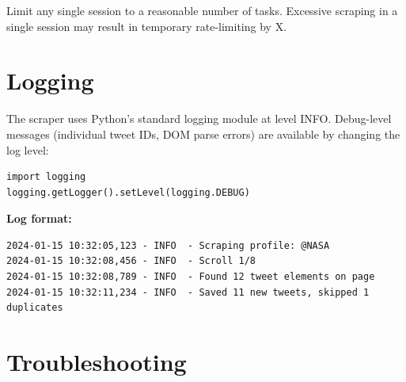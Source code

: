 \documentclass[11pt, a4paper]{article}
\newenvironment{tipbox}[1][Tip]{%
  \begin{tcolorbox}[enhanced, breakable,
    colback=TwGreen!8, colframe=TwGreen,
    boxrule=0.8pt, arc=5pt,
    left=8pt, right=8pt, top=5pt, bottom=5pt,
    title={\textbf{#1}},
    fonttitle=\small\color{TwGreen!70!black},
    attach boxed title to top left={yshift=-2mm, xshift=8mm},
    boxed title style={colback=TwGreen!8, colframe=TwGreen, arc=3pt}]
}{\end{tcolorbox}}
\def\texttt#1{#1}%
\def\color#1{}%
\begin{document}
\begin{tipbox}[Best Practice]
Limit any single session to a reasonable number of tasks. Excessive scraping
in a single session may result in temporary rate-limiting by X.
\end{tipbox}

\section{Logging}

The scraper uses Python's standard \texttt{logging} module at level \texttt{INFO}.
Debug-level messages (individual tweet IDs, DOM parse errors) are available
by changing the log level:

\begin{tcolorbox}[pybox, title=Enable debug logging]
\begin{lstlisting}[style=pycode]
import logging
logging.getLogger().setLevel(logging.DEBUG)
\end{lstlisting}
\end{tcolorbox}

\textbf{Log format:}
\begin{tcolorbox}[bashbox]
\begin{lstlisting}[style=bashcode]
2024-01-15 10:32:05,123 - INFO  - Scraping profile: @NASA
2024-01-15 10:32:08,456 - INFO  - Scroll 1/8
2024-01-15 10:32:08,789 - INFO  - Found 12 tweet elements on page
2024-01-15 10:32:11,234 - INFO  - Saved 11 new tweets, skipped 1 duplicates
\end{lstlisting}
\end{tcolorbox}
\newpage
\section{Troubleshooting}
\end{document}
